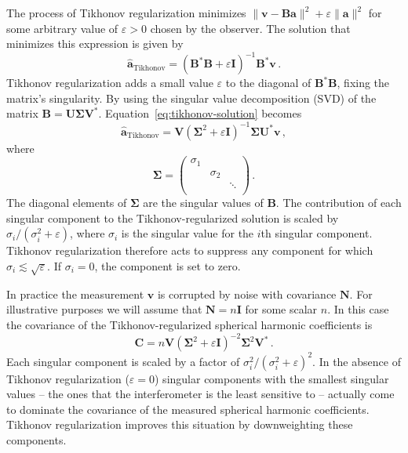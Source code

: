 \documentclass[twocolumn]{aastex61}
\renewcommand{\b}{\pmb}
\newcommand{\atikh}{\b{\hat a}_\text{Tikhonov}}
\begin{document}
The process of Tikhonov regularization minimizes $\|\b v - \b B\b a\|^2 + \varepsilon\|\b a\|^2$ for
some arbitrary value of $\varepsilon > 0$ chosen by the observer. The solution that minimizes this
expression is given by
\begin{equation}\label{eq:tikhonov-solution}
    \atikh = (\b B^*\b B + \varepsilon\b I)^{-1}\b B^*\b v\,.
\end{equation}
Tikhonov regularization adds a small value $\varepsilon$ to the diagonal of $\b B^*\b B$, fixing the
matrix's singularity. By using the singular value decomposition (SVD) of the matrix $\b B = \b U \b
\Sigma \b V^*$. Equation~\ref{eq:tikhonov-solution} becomes
\begin{equation}
    \atikh = \b V (\b\Sigma^2 + \varepsilon \b I)^{-1}\b\Sigma \b U^*\b v\,,
\end{equation}
where
\[
    \b\Sigma = \left(
        \begin{array}{ccc}
            \sigma_1 & & \\
                     & \sigma_2 & \\
                     & & \ddots \\
        \end{array}
    \right)\,.
\]
The diagonal elements of $\b\Sigma$ are the singular values of $\b B$. The contribution of each
singular component to the Tikhonov-regularized solution is scaled by $\sigma_i / (\sigma_i^2 +
\varepsilon)$, where $\sigma_i$ is the singular value for the $i$th singular component. Tikhonov
regularization therefore acts to suppress any component for which
$\sigma_i\lesssim\sqrt{\varepsilon}$.  If $\sigma_i = 0$, the component is set to zero.

In practice the measurement $\b v$ is corrupted by noise with covariance $\b N$. For illustrative
purposes we will assume that $\b N=n\b I$ for some scalar $n$. In this case the covariance of the
Tikhonov-regularized spherical harmonic coefficients is
\begin{equation}
    \b C = n \b V (\b\Sigma^2 + \varepsilon\b I)^{-2} \b\Sigma^2 \b V^*\,.
\end{equation}
Each singular component is scaled by a factor of $\sigma_i^2/(\sigma_i^2 + \varepsilon)^2$.  In the
absence of Tikhonov regularization ($\varepsilon=0$) singular components with the smallest singular
values -- the ones that the interferometer is the least sensitive to -- actually come to dominate
the covariance of the measured spherical harmonic coefficients. Tikhonov regularization improves
this situation by downweighting these components.
\end{document}
